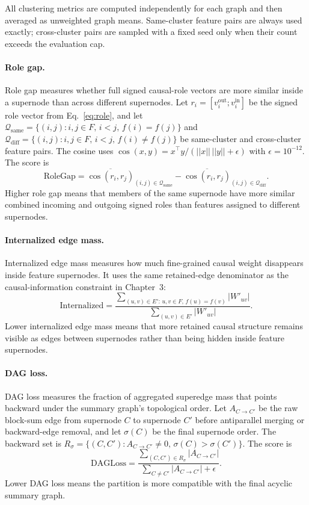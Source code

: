 \documentclass[../main.tex]{subfiles}
\begin{document}
All clustering metrics are computed independently for each graph and then
averaged as unweighted graph means. Same-cluster feature pairs are always used
exactly; cross-cluster pairs are sampled with a fixed seed only when their count
exceeds the evaluation cap.

\paragraph{Role gap.}
Role gap measures whether full signed causal-role vectors are more similar
inside a supernode than across different supernodes. Let
$r_i=[v_i^{\text{out}};v_i^{\text{in}}]$ be the signed role vector from
Eq.~\eqref{eq:role}, and let
$\mathcal{Q}_{\text{same}}=\{(i,j): i,j\in F,\, i<j,\, f(i)=f(j)\}$ and
$\mathcal{Q}_{\text{diff}}=\{(i,j): i,j\in F,\, i<j,\, f(i)\ne f(j)\}$ be
same-cluster and cross-cluster feature pairs. The cosine uses
$\cos(x,y)=x^\top y/(||x||\,||y||+\epsilon)$ with $\epsilon=10^{-12}$. The score
is
\begin{equation}
\mathrm{RoleGap}
=
\overline{\cos(r_i,r_j)}_{(i,j)\in\mathcal{Q}_{\text{same}}}
-
\overline{\cos(r_i,r_j)}_{(i,j)\in\mathcal{Q}_{\text{diff}}}.
\label{eq:metric-role-gap}
\end{equation}
Higher role gap means that members of the same supernode have more similar
combined incoming and outgoing signed roles than features assigned to different
supernodes.

\paragraph{Internalized edge mass.}
Internalized edge mass measures how much fine-grained causal weight disappears
inside feature supernodes. It uses the same retained-edge denominator as the
causal-information constraint in Chapter~3:
\begin{equation}
\mathrm{Internalized}
=
\frac{\sum_{(u,v)\in E':\, u,v\in F,\, f(u)=f(v)} |W'_{uv}|}
     {\sum_{(u,v)\in E'} |W'_{uv}|}.
\label{eq:metric-internalized}
\end{equation}
Lower internalized edge mass means that more retained causal structure remains
visible as edges between supernodes rather than being hidden inside feature
supernodes.

\paragraph{DAG loss.}
DAG loss measures the fraction of aggregated superedge mass that points backward
under the summary graph's topological order. Let $A_{C\to C'}$ be the raw
block-sum edge from supernode $C$ to supernode $C'$ before antiparallel merging
or backward-edge removal, and let $\sigma(C)$ be the final supernode order. The
backward set is
$R_\sigma=\{(C,C'): A_{C\to C'}\ne 0,\, \sigma(C)>\sigma(C')\}$. The score is
\begin{equation}
\mathrm{DAGLoss}
=
\frac{\sum_{(C,C')\in R_\sigma}|A_{C\to C'}|}
     {\sum_{C\ne C'}|A_{C\to C'}|+\epsilon}.
\label{eq:metric-dagloss}
\end{equation}
Lower DAG loss means the partition is more compatible with the final acyclic
summary graph.
\end{document}
